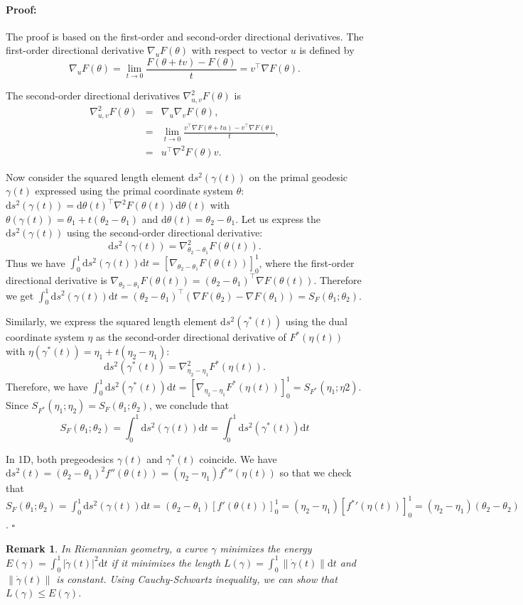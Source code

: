 \documentclass[11pt]{article}
\def\ds{\mathrm{d}s}
\def\dt{\mathrm{d}t}
\def\dtheta{\mathrm{d}\theta}
\newenvironment{proof}{\paragraph{Proof:}}{\hfill$\square$}
\newtheorem{Remark}{Remark}
\begin{document}
\begin{proof}
The proof is based on the first-order and second-order directional derivatives.
The first-order directional derivative $\nabla_u F(\theta)$ with respect to vector $u$ is defined by 
$$
\nabla_u F(\theta)=\lim_{t\rightarrow 0} \frac{F(\theta+tv)-F(\theta)}{t}=v^\top \nabla F(\theta).
$$
 
The second-order directional derivatives $\nabla_{u,v}^2 F(\theta)$ is
\begin{eqnarray*}
\nabla_{u,v}^2 F(\theta) &=& \nabla_{u} \nabla_v F(\theta),\\
 &=& \lim_{t\rightarrow 0} \frac{v^\top \nabla F(\theta+tu)-v^\top\nabla F(\theta)}{t},\\
&=& u^\top \nabla^2 F(\theta) v.
\end{eqnarray*}


Now consider the squared length element $\ds^2(\gamma(t))$ on the primal geodesic $\gamma(t)$ expressed using the primal coordinate system $\theta$:
$\ds^2(\gamma(t))=\dtheta(t)^\top \nabla^2F(\theta(t)) \dtheta(t)$ with $\theta(\gamma(t))=\theta_1+t(\theta_2-\theta_1)$ and $\dtheta(t)=\theta_2-\theta_1$.
Let us express the $\ds^2(\gamma(t))$   using the second-order directional derivative:
$$
\ds^2(\gamma(t))=\nabla^2_{\theta_2-\theta_1}  F(\theta(t)).
$$
Thus we have $\int_0^1 \ds^2(\gamma(t))\dt=[\nabla_{\theta_2-\theta_1}  F(\theta(t))]_0^1$,
where the first-order directional derivative is $\nabla_{\theta_2-\theta_1}  F(\theta(t))=(\theta_2-\theta_1)^\top \nabla F(\theta(t))$.
Therefore we get $\int_0^1 \ds^2(\gamma(t))\dt=(\theta_2-\theta_1)^\top (\nabla F(\theta_2)-\nabla F(\theta_1))=S_F(\theta_1;\theta_2)$.

Similarly, we express the squared length element $\ds^2(\gamma^*(t))$ using the dual coordinate system $\eta$ as the second-order directional derivative of $F^*(\eta(t))$ with $\eta(\gamma^*(t))=\eta_1+t(\eta_2-\eta_1)$:
$$
\ds^2(\gamma^*(t))=\nabla^2_{\eta_2-\eta_1}  F^*(\eta(t)).
$$
Therefore, we have  $\int_0^1 \ds^2(\gamma^*(t))\dt=[\nabla_{\eta_2-\eta_1}  F^*(\eta(t))]_0^1=S_{F^*}(\eta_1;\eta2)$.
Since $S_{F^*}(\eta_1;\eta_2)=S_F(\theta_1;\theta_2)$, we conclude that
$$
S_F(\theta_1;\theta_2)=\int_0^1 \ds^2(\gamma(t))\dt=\int_0^1 \ds^2(\gamma^*(t))\dt
$$

In 1D, both pregeodesics $\gamma(t)$ and $\gamma^*(t)$ coincide. We have $\ds^2(t)=(\theta_2-\theta_1)^2 f''(\theta(t))=(\eta_2-\eta_1){f^*}''(\eta(t))$ so that we check that $S_F(\theta_1;\theta_2)=\int_0^1 \ds^2(\gamma(t))\dt=(\theta_2-\theta_1)[f'(\theta(t))]_0^1=(\eta_2-\eta_1)[{f^*}'(\eta(t))]_0^1=(\eta_2-\eta_1)(\theta_2-\theta_2)$.
\end{proof}


\begin{Remark}
In Riemannian geometry, a curve $\gamma$ minimizes the energy $E(\gamma)=\int_0^1 |\dot\gamma(t)|^2\dt$ if it minimizes the length $L(\gamma)=\int_0^1 \|\dot\gamma(t)\|\dt$ and $\|\dot\gamma(t)\|$ is constant. Using Cauchy-Schwartz inequality, we can show that $L(\gamma)\leq E(\gamma)$.
\end{Remark}



\end{document}
